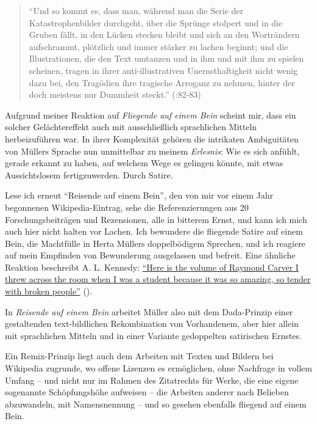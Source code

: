 \documentclass[fontsize=12pt]{scrartcl}
\begin{document}
\singlespacing
\begin{quote}
"`Und so kommt es, dass man, w\"ahrend man die Serie der Katastrophenbilder durchgeht, \"uber die Spr\"unge stolpert und in die Gruben f\"allt, in den L\"ucken stecken bleibt und sich an den Wortr\"andern aufschrammt, pl\"otzlich und immer st\"arker zu lachen beginnt; und die Illustrationen, die den Text umtanzen und in ihm und mit ihm zu spielen scheinen, tragen in ihrer anti-illustrativen Unernsthaftigkeit nicht wenig dazu bei, den Trag\"odien ihre tragische Arroganz zu nehmen, hinter der doch meistens nur Dummheit steckt."' (\cite{Wertheimer2002}:82-83)
\end{quote}
\onehalfspacing

Aufgrund meiner Reaktion auf \textit{Fliegende auf einem Bein} scheint mir, dass ein solcher Gel\"achtereffekt auch mit ausschlie{\ss}lich sprachlichen Mitteln herbeizuf\"uhren war. In ihrer Komplexit\"at geh\"oren die intrikaten Ambiguit\"aten von M\"ullers Sprache nun unmittelbar zu meinem \textit{Erlesnis}: Wie es sich anf\"uhlt, gerade erkannt zu haben, auf welchem Wege es gelingen k\"onnte, mit etwas Aussichtslosem fertigzuwerden. Durch Satire. 

Lese ich erneut "`Reisende auf einem Bein"', den von mir vor einem Jahr begonnenen Wi\-ki\-pe\-dia-Eintrag, sehe die Referenzierungen aus 20 For\-schungsbeitr\"agen und Re\-zen\-si\-o\-nen, alle in bitterem Ernst, und kann ich mich auch \mbox{hier} nicht halten vor Lachen. Ich bewundere die fliegende Satire auf einem Bein, die Machtf\"ulle in Herta M\"ullers doppelb\"odigem Sprechen, und ich reagiere auf mein Empfinden von Bewunderung ausgelassen und befreit. Eine \"ahnliche Reaktion beschreibt A. L. Kennedy: \href{http://www.theguardian.com/books/booksblog/2013/feb/05/al-kennedy-home-thoughts-creative-writing}{"`Here is the volume of Raymond Carver I threw across the room when I was a student because it was so amazing, so tender with broken people"'} (\cite{Kennedy2013}). 

In \textit{Reisende auf einem Bein} arbeitet M\"uller also mit dem Dada-Prinzip einer gestaltenden text-bildlichen Rekombination von Vorhandenem, aber hier al\-lein mit sprach\-li\-chen Mit\-teln und in einer Variante gedoppelten satirischen Ernstes. 

Ein Remix-Prinzip liegt auch dem Arbei\-ten mit Texten und Bildern bei Wi\-ki\-pe\-dia zugrunde, wo offene Lizenzen es erm\"oglichen, ohne Nachfrage in vollem Umfang -- und nicht nur im Rahmen des Zitatrechts f\"ur Werke, die eine eigene sogenannte Sch\"opfungsh\"ohe aufweisen -- die Arbei\-ten an\-de\-rer nach Belieben abzuwandeln, mit Namensnennung -- und so gesehen ebenfalls fliegend auf einem Bein.
\end{document}
